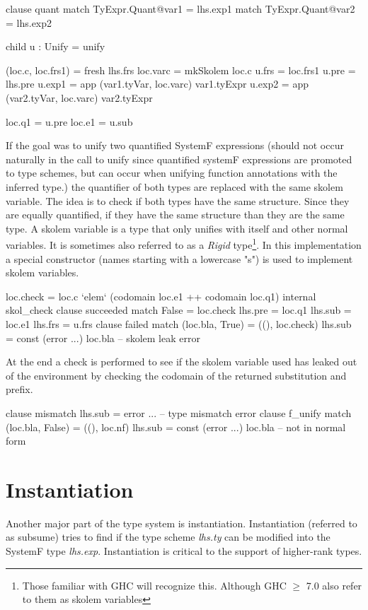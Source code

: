 \begin{code}
clause quant
  match TyExpr.Quant@var1 = lhs.exp1
  match TyExpr.Quant@var2 = lhs.exp2
  
  child u : Unify = unify
  
  (loc.c, loc.frs1) = fresh lhs.frs
  loc.varc = mkSkolem loc.c
  u.frs   = loc.frs1
  u.pre   = lhs.pre
  u.exp1  = app (var1.tyVar, loc.varc) var1.tyExpr
  u.exp2  = app (var2.tyVar, loc.varc) var2.tyExpr
          
  loc.q1  = u.pre
  loc.e1  = u.sub
\end{code}
If the goal was to unify two quantified SystemF expressions (should not occur naturally in the call to unify since quantified systemF expressions are promoted to type schemes, but can occur when unifying function annotations with the inferred type.) the quantifier of both types are replaced with the same skolem variable. The idea is to check if both types have the same structure. Since they are equally quantified, if they have the same structure than they are the same type.
A skolem variable is a type that only unifies with itself and other normal variables. It is sometimes also referred to as a \emph{Rigid} type\footnote{Those familiar with GHC will recognize this. Although GHC $\geq$ 7.0 also refer to them as skolem variables}. In this implementation a special constructor (names starting with a lowercase "s") is used to implement skolem variables.
\begin{code}                       
loc.check = loc.c `elem` (codomain loc.e1 ++ codomain loc.q1)
internal skol_check
   clause succeeded
     match False  = loc.check
     lhs.pre  = loc.q1
     lhs.sub  = loc.e1
     lhs.frs  = u.frs
   clause failed
     match (loc.bla, True) = ((), loc.check)
     lhs.sub = const (error ...) loc.bla -- skolem leak error
\end{code}
At the end a check is performed to see if the skolem variable used has leaked out of the environment by checking the codomain of the returned substitution and prefix.

\begin{code}
    clause mismatch
      lhs.sub = error ... -- type mismatch error
clause f_unify
  match (loc.bla, False) = ((), loc.nf)
  lhs.sub = const (error ...) loc.bla -- not in normal form
\end{code}

\section{Instantiation}
Another major part of the type system is instantiation. Instantiation (referred to as subsume) tries to find if the type scheme \emph{lhs.ty} can be modified into the SystemF type \emph{lhs.exp}. Instantiation is critical to the support of higher-rank types.

